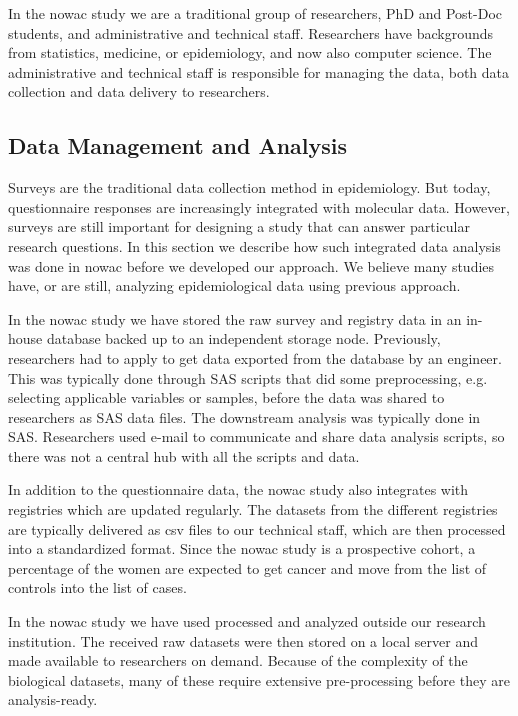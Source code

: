 In the \gls{nowac} study we are a traditional group of researchers, PhD and
Post-Doc students, and administrative and technical staff. Researchers have
backgrounds from statistics, medicine, or epidemiology, and now also computer
science. The administrative and technical staff is responsible for managing the
data, both data collection and data delivery to researchers. 

\subsection{Data Management and Analysis} 
Surveys are the traditional data collection method in epidemiology. But
today, questionnaire responses are increasingly integrated with molecular data.
However, surveys are still important for designing a study that can answer
particular research questions.  In this section we describe how such integrated
data analysis was done in \gls{nowac} before we developed our approach. We
believe many studies have, or are still, analyzing epidemiological data using
previous approach. 

In the \gls{nowac} study we have stored the raw survey and registry data in an
in-house database backed up to an independent storage node. Previously,
researchers had to apply to get data exported from the database by an engineer.
This was typically done through SAS scripts that did some preprocessing, e.g.
selecting applicable variables or samples, before the data was shared to
researchers as SAS data files. The downstream analysis was typically done in
SAS. Researchers used e-mail to communicate and share data analysis scripts, so
there was not a central hub with all the scripts and data. 

In addition to the questionnaire data, the \gls{nowac} study also integrates
with registries which are updated regularly. The datasets from the different
registries are typically delivered as \gls{csv} files to our technical staff,
which are then processed into a standardized format. Since the \gls{nowac} study
is a prospective cohort, a percentage of the women are expected to get cancer
and move from the list of controls into the list of cases. 

In the \gls{nowac} study we have used processed and analyzed outside our
research institution.  The received raw datasets were then stored on a
local server and made available to researchers on demand. Because of the
complexity of the biological datasets, many of these require extensive
pre-processing before they are analysis-ready. 


